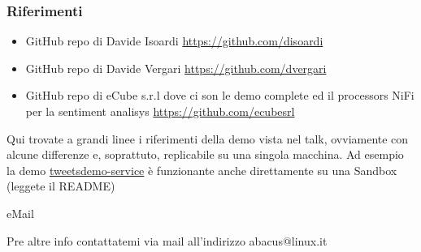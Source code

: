 \begin{frame}
	\frametitle{Riferimenti}
	\begin{itemize}
		\item GitHub repo di Davide Isoardi \href{https://github.com/disoardi}{https://github.com/disoardi}
		\item GitHub repo di Davide Vergari \href{https://github.com/dvergari}{https://github.com/dvergari}
		\item GitHub repo di eCube s.r.l dove ci son le demo complete ed il processors NiFi per la sentiment analisys \href{https://github.com/ecubesrl}{https://github.com/ecubesrl}
	\end{itemize}
	\begin{block}{}
		\begin{center}
			Qui trovate a grandi linee i riferimenti della demo vista nel talk, ovviamente con alcune differenze e, soprattuto, replicabile su una singola macchina. Ad esempio la demo \href{https://github.com/ecubesrl/tweetsdemo-service}{tweetsdemo-service} è funzionante anche direttamente su una Sandbox (leggete il README)
		\end{center}
	\end{block}
	\begin{block}{eMail}
		\begin{center}
			Pre altre info contattatemi via mail all'indirizzo abacus@linux.it
		\end{center}
	\end{block}

\end{frame}





